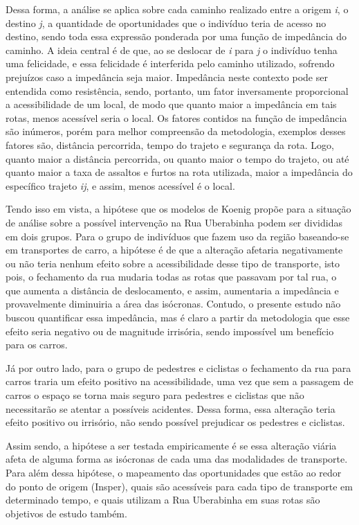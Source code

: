 Dessa forma, a análise se aplica sobre cada caminho realizado entre a origem \textit{i}, o destino \textit{j}, a quantidade de oportunidades que o indivíduo teria de acesso no destino, sendo toda essa expressão ponderada por uma função de impedância do caminho. A ideia central é de que, ao se deslocar de \textit{i} para \textit{j} o indivíduo tenha uma felicidade, e essa felicidade é interferida pelo caminho utilizado, sofrendo prejuízos caso a impedância seja maior. Impedância neste contexto pode ser entendida como resistência, sendo, portanto, um fator inversamente proporcional a acessibilidade de um local, de modo que quanto maior a impedância em tais rotas, menos acessível seria o local. Os fatores contidos na função de impedância são inúmeros, porém para melhor compreensão da metodologia, exemplos desses fatores são, distância percorrida, tempo do trajeto e segurança da rota. Logo, quanto maior a distância percorrida, ou quanto maior o tempo do trajeto, ou até quanto maior a taxa de assaltos e furtos na rota utilizada, maior a impedância do específico trajeto \textit{ij}, e assim, menos acessível é o local.

Tendo isso em vista, a hipótese que os modelos de Koenig propõe para a situação de análise sobre a possível intervenção na Rua Uberabinha podem ser divididas em dois grupos. Para o grupo de indivíduos que fazem uso da região baseando-se em transportes de carro, a hipótese é de que a alteração afetaria negativamente ou não teria nenhum efeito sobre a acessibilidade desse tipo de transporte, isto pois, o fechamento da rua mudaria todas as rotas que passavam por tal rua, o que aumenta a distância de deslocamento, e assim, aumentaria a impedância e provavelmente diminuiria a área das isócronas. Contudo, o presente estudo não buscou quantificar essa impedância, mas é claro a partir da metodologia que esse efeito seria negativo ou de magnitude irrisória, sendo impossível um benefício para os carros. 

Já por outro lado, para o grupo de pedestres e ciclistas o fechamento da rua para carros traria um efeito positivo na acessibilidade, uma vez que sem a passagem de carros o espaço se torna mais seguro para pedestres e ciclistas que não necessitarão se atentar a possíveis acidentes. Dessa forma, essa alteração teria efeito positivo ou irrisório, não sendo possível prejudicar os pedestres e ciclistas.

Assim sendo, a hipótese a ser testada empiricamente é se essa alteração viária afeta de alguma forma as isócronas de cada uma das modalidades de transporte. Para além dessa hipótese, o mapeamento das oportunidades que estão ao redor do ponto de origem (Insper), quais são acessíveis para cada tipo de transporte em determinado tempo, e quais utilizam a Rua Uberabinha em suas rotas são objetivos de estudo também.


